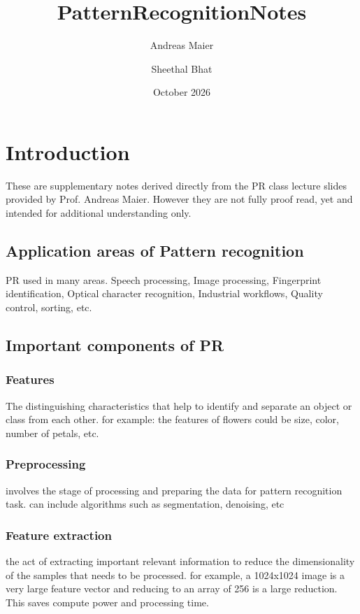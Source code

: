 \documentclass{article}
\title{PatternRecognitionNotes}
\author{Andreas Maier \and Sheethal Bhat}
\date{October 2026}
\begin{document}
\maketitle 

\tableofcontents
\section{Introduction}

These are supplementary notes derived directly from the PR class lecture slides provided by Prof. Andreas Maier. However they are not fully proof read, yet and intended for additional understanding only. 

\subsection{Application areas of Pattern recognition}
PR used in many areas. 
Speech processing, Image processing, Fingerprint identification, Optical character recognition, Industrial workflows, Quality control, sorting, etc. 

\subsection{Important components of PR}
\subsubsection{Features}
The distinguishing characteristics that help to identify and separate an object or class from each other. for example: the features of flowers could be size, color, number of petals, etc. 

\subsubsection{Preprocessing}
involves the stage of processing and preparing the data for pattern recognition task. can include algorithms such as segmentation, denoising, etc

\subsubsection{Feature extraction}
the act of extracting important relevant information to reduce the dimensionality of the samples that needs to be processed. for example, a 1024x1024 image is a very large feature vector and reducing to an array of 256 is a large reduction. This saves compute power and processing time. 
\end{document}
